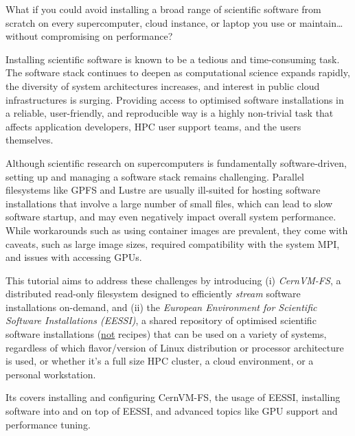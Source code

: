 What if you could avoid installing a broad range of scientific software from scratch on every
supercomputer, cloud instance, or laptop you use or maintain\ldots without compromising on performance?

Installing scientific software is known to be a tedious and time-consuming task. The software stack
continues to deepen as computational science expands rapidly, the diversity of system architectures
increases, and interest in public cloud infrastructures is surging.
Providing access to optimised software installations in a reliable, user-friendly, and reproducible way
is a highly non-trivial task that affects application developers, HPC user support teams, and the users themselves.

Although scientific research on supercomputers is fundamentally software-driven,
setting up and managing a software stack remains challenging.
Parallel filesystems like GPFS and Lustre are usually ill-suited for hosting software installations
that involve a large number of small files, which can lead to slow software startup, and may even negatively impact
overall system performance.
While workarounds such as using container images are prevalent, they come with caveats,
such as large image sizes, required compatibility with the system MPI,
and issues with accessing GPUs.

This tutorial aims to address these challenges by introducing (i) \emph{CernVM-FS},
a distributed read-only filesystem designed to efficiently \emph{stream} software installations on-demand,
and (ii) the \emph{European Environment for Scientific Software Installations (EESSI)},
a shared repository of optimised scientific software installations (\underline{not} recipes) that can be used on a variety of
systems, regardless of which flavor/version of Linux distribution or processor architecture is used, or whether it's a full size HPC
cluster, a cloud environment, or a personal workstation.

Its covers installing and configuring CernVM-FS, the usage of EESSI,
installing software into and on top of EESSI, and advanced topics like GPU support and performance tuning.
